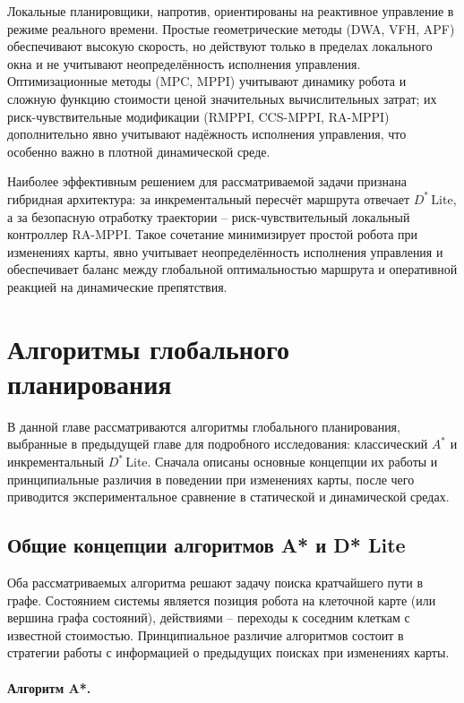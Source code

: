 \documentclass[a4paper,12pt]{extarticle}
\begin{document}
Локальные планировщики, напротив, ориентированы на реактивное управление в режиме реального времени. Простые геометрические методы (DWA, VFH, APF) обеспечивают высокую скорость, но действуют только в пределах локального окна и не учитывают неопределённость исполнения управления. Оптимизационные методы (MPC, MPPI) учитывают динамику робота и сложную функцию стоимости ценой значительных вычислительных затрат; их риск-чувствительные модификации (RMPPI, CCS-MPPI, RA-MPPI) дополнительно явно учитывают надёжность исполнения управления, что особенно важно в плотной динамической среде.

Наиболее эффективным решением для рассматриваемой задачи признана гибридная архитектура: за инкрементальный пересчёт маршрута отвечает $D^*$\,Lite, а за безопасную отработку траектории -- риск-чувствительный локальный контроллер RA-MPPI. Такое сочетание минимизирует простой робота при изменениях карты, явно учитывает неопределённость исполнения управления и обеспечивает баланс между глобальной оптимальностью маршрута и оперативной реакцией на динамические препятствия.
    \clearpage


    \section{Алгоритмы глобального планирования}

    В данной главе рассматриваются алгоритмы глобального планирования, выбранные в предыдущей главе для подробного исследования: классический $A^*$ и инкрементальный $D^*$\,Lite. Сначала описаны основные концепции их работы и принципиальные различия в поведении при изменениях карты, после чего приводится экспериментальное сравнение в статической и динамической средах.

    \subsection{Общие концепции алгоритмов A* и D* Lite}

    Оба рассматриваемых алгоритма решают задачу поиска кратчайшего пути в графе. Состоянием системы является позиция робота на клеточной карте (или вершина графа состояний), действиями -- переходы к соседним клеткам с известной стоимостью. Принципиальное различие алгоритмов состоит в стратегии работы с информацией о предыдущих поисках при изменениях карты.

    \paragraph{Алгоритм A*.}
\end{document}
